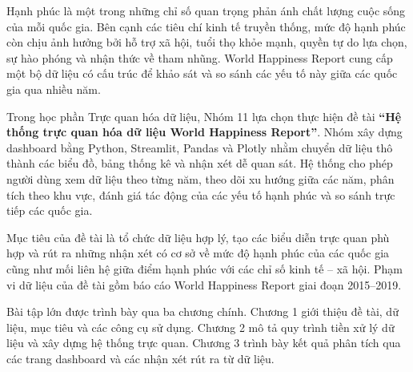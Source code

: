 
Hạnh phúc là một trong những chỉ số quan trọng phản ánh chất lượng cuộc sống của mỗi quốc gia. Bên cạnh các tiêu chí kinh tế truyền thống, mức độ hạnh phúc còn chịu ảnh hưởng bởi hỗ trợ xã hội, tuổi thọ khỏe mạnh, quyền tự do lựa chọn, sự hào phóng và nhận thức về tham nhũng. World Happiness Report cung cấp một bộ dữ liệu có cấu trúc để khảo sát và so sánh các yếu tố này giữa các quốc gia qua nhiều năm.

Trong học phần Trực quan hóa dữ liệu, Nhóm 11 lựa chọn thực hiện đề tài \textbf{“Hệ thống trực quan hóa dữ liệu World Happiness Report”}. Nhóm xây dựng dashboard bằng Python, Streamlit, Pandas và Plotly nhằm chuyển dữ liệu thô thành các biểu đồ, bảng thống kê và nhận xét dễ quan sát. Hệ thống cho phép người dùng xem dữ liệu theo từng năm, theo dõi xu hướng giữa các năm, phân tích theo khu vực, đánh giá tác động của các yếu tố hạnh phúc và so sánh trực tiếp các quốc gia.

Mục tiêu của đề tài là tổ chức dữ liệu hợp lý, tạo các biểu diễn trực quan phù hợp và rút ra những nhận xét có cơ sở về mức độ hạnh phúc của các quốc gia cũng như mối liên hệ giữa điểm hạnh phúc với các chỉ số kinh tế -- xã hội. Phạm vi dữ liệu của đề tài gồm báo cáo World Happiness Report giai đoạn 2015--2019.

Bài tập lớn được trình bày qua ba chương chính. Chương 1 giới thiệu đề tài, dữ liệu, mục tiêu và các công cụ sử dụng. Chương 2 mô tả quy trình tiền xử lý dữ liệu và xây dựng hệ thống trực quan. Chương 3 trình bày kết quả phân tích qua các trang dashboard và các nhận xét rút ra từ dữ liệu.
